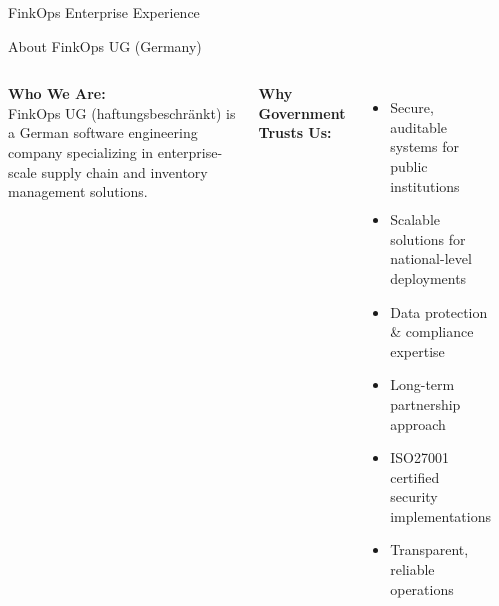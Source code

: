 \documentclass[aspectratio=169,10pt]{beamer}
\begin{document}
\begin{frame}{FinkOps Enterprise Experience}
\vspace{0.2cm}
\begin{center}
\end{center}
\end{frame}

\begin{frame}{About FinkOps UG (Germany)}
\begin{columns}[T]
\vspace{0.2cm}
\textbf{\color{primary}Who We Are:}\\[4pt]
{\small FinkOps UG (haftungsbeschr\"ankt) is a German software engineering company specializing in enterprise-scale supply chain and inventory management solutions.}

\vspace{0.4cm}
\textbf{\color{primary}Why Government Trusts Us:}
\begin{itemize}\small
  \item[\color{accent}\faIcon{check}] Secure, auditable systems for public institutions
  \item[\color{accent}\faIcon{check}] Scalable solutions for national-level deployments
  \item[\color{accent}\faIcon{check}] Data protection \& compliance expertise
  \item[\color{accent}\faIcon{check}] Long-term partnership approach
  \item[\color{accent}\faIcon{check}] ISO27001 certified security implementations
  \item[\color{accent}\faIcon{check}] Transparent, reliable operations
\end{itemize}

\vspace{0.2cm}
\begin{center}
\end{center}
\end{columns}
\end{frame}
\end{document}
